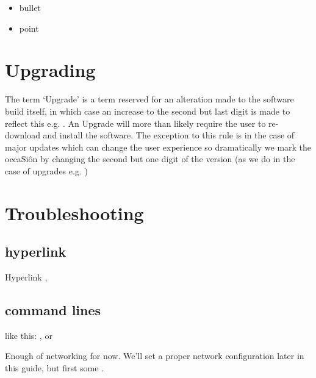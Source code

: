 \documentclass[letterpaper,10pt,openany,oneside,english]{sphinxmanual}
\begin{document}
\begin{itemize}
\item {} 
bullet

\item {} 
point

\end{itemize}


\section{Upgrading}
\label{\detokenize{upgrading:upgrading}}\label{\detokenize{upgrading::doc}}
The term ‘Upgrade’ is a term reserved for an alteration made to the software build itself, in which case an increase to the second but last digit is made to reflect this e.g. .  An Upgrade will more than likely require the user to re-download and install the software. The exception to this rule is in the case of major updates which can change the user experience so dramatically we mark the occaSiôn by changing the second but one digit of the version (as we do in the case of upgrades e.g. )


\section{Troubleshooting}
\label{\detokenize{troubleshooting:troubleshooting}}\label{\detokenize{troubleshooting::doc}}

\subsection{hyperlink}
\label{\detokenize{troubleshooting:hyperlink}}
Hyperlink ,


\subsection{command lines}
\label{\detokenize{troubleshooting:command-lines}}
like this: ,  or

Enough of networking for now. We’ll set a proper network configuration later in this guide, but first some .
\end{document}
